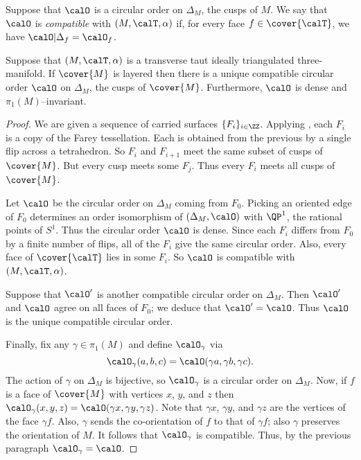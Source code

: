 \documentclass[12pt]{amsart}
\begin{document}
\begin{definition}
\label{Def:Compatible}
Suppose that $\calO$ is a circular order on $\Delta_M$, the cusps of $M$.  We say that $\calO$ is \emph{compatible} with $(M, \calT, \alpha)$ if, for every face $f \in \cover{\calT}$, we have $\calO | \Delta_f = \calO_f$.  
\end{definition}

\begin{lemma}
\label{Lem:LayeredImpliesUnique}
Suppose that $(M, \calT, \alpha)$ is a transverse taut ideally triangulated three-manifold.
If $\cover{M}$ is layered then there is a unique compatible circular order $\calO$ on $\Delta_M$, the cusps of $\cover{M}$.  Furthermore, $\calO$ is dense and $\pi_1(M)$--invariant. 
\end{lemma}
 
\begin{proof}
We are given a sequence of carried surfaces $\{F_i\}_{i \in \ZZ}$.  Applying \cite[Corollary~1.1]{SchleimerSegerman19}, each $F_i$ is a copy of the Farey tessellation.  Each is obtained from the previous by a single flip across a tetrahedron.  So $F_i$ and $F_{i+1}$ meet the same subset of cusps of $\cover{M}$.  But every cusp meets some $F_j$.  Thus every $F_i$ meets all cusps of $\cover{M}$.

Let $\calO$ be the circular order on $\Delta_M$ coming from $F_0$.  Picking an oriented edge of $F_0$ determines an order isomorphism of $(\Delta_M, \calO)$ with $\QP^1$, the rational points of $S^1$.  Thus the circular order $\calO$ is dense.  Since each $F_i$ differs from $F_0$ by a finite number of flips, all of the $F_i$ give the same circular order.  Also, every face of $\cover{\calT}$ lies in some $F_i$.  So $\calO$ is compatible with $(M, \calT, \alpha)$.  

Suppose that $\calO'$ is another compatible circular order on $\Delta_M$.  Then $\calO'$ and $\calO$ agree on all faces of $F_0$; we deduce that $\calO' = \calO$.   
Thus $\calO$ is the unique compatible circular order.

Finally, fix any $\gamma \in \pi_1(M)$ and define $\calO_\gamma$ via 
\[
\calO_\gamma(a, b, c) = \calO(\gamma a, \gamma b, \gamma c).
\]
The action of $\gamma$ on $\Delta_M$ is bijective, so $\calO_\gamma$ is a circular order on $\Delta_M$.  Now, if $f$ is a face of $\cover{M}$ with vertices $x$, $y$, and $z$ then $\calO_\gamma(x, y, z) = \calO(\gamma x, \gamma y, \gamma z)$.  Note that $\gamma x$, $\gamma y$, and $\gamma z$ are the vertices of the face $\gamma f$.  Also, $\gamma$ sends the co-orientation of $f$ to that of $\gamma f$; also $\gamma$ preserves the orientation of $M$.  It follows that $\calO_\gamma$ is compatible.  Thus, by the previous paragraph $\calO_\gamma = \calO$. 
\end{proof}
\end{document}
